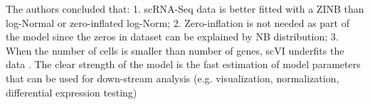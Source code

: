 The authors concluded that: 1. scRNA-Seq data is better fitted with a ZINB than log-Normal or zero-inflated log-Norm; 2. Zero-inflation is not needed as part of the model since the zeros in dataset can be explained by NB distribution; 3. When the number of cells is smaller than number of genes, scVI underfits the data \citep{Lopez2018}. The clear strength of the model is the fast estimation of model parameters that can be used for down-stream analysis (e.g. visualization, normalization, differential expression testing)
 

